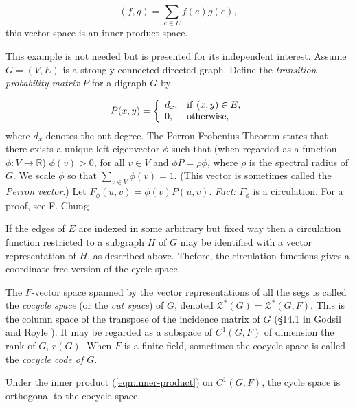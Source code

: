 \begin{equation}
(f,g)=\sum_{e\in E} f(e)g(e),
\end{equation}
this vector space is an inner product space.

\begin{example}
{\rm
This example is not needed but is presented for its independent
interest. Assume $G=(V,E)$ is a strongly connected directed graph.
Define the {\it transition probability matrix} $P$ for a digraph
$G$ by

\[
P(x,y)=\left\{
\begin{array}{ll}
d_x, & {\rm if}\ (x, y) \in E,\\
0, & {\rm otherwise},
\end{array}
\right.
\]
where $d_x$ denotes the out-degree.
The Perron-Frobenius Theorem states that there exists a unique 
left eigenvector $\phi$ such that (when regarded as a function
$\phi:V\to {\mathbb{R}}$) $\phi (v) > 0$, for all $v\in V$ and 
$\phi P  = \rho \phi$, where $\rho$ is the spectral radius of
$G$. We scale $\phi$ so that $\sum_{v\in V}  \phi(v) = 1$.
(This vector is sometimes called the {\it Perron vector}.)
 Let $F_\phi (u, v) = \phi(v)P (u, v)$. 
{\it Fact:} $F_\phi$ is a circulation.
For a proof, see F. Chung \cite{Chung2005}.
}
\end{example}

 If the edges of $E$ are indexed in some arbitrary but fixed way then
 a circulation function restricted to a subgraph $H$ of $G$
 may be identified with a vector representation of $H$,
 as described above. Thefore, the circulation functions gives a
 coordinate-free version of the cycle space.

The $F$-vector space spanned by the vector representations of 
all the segs is called the {\it cocycle space} (or the {\it cut space}) of $G$, 
denoted ${\mathcal Z}^*(G)={\mathcal Z}^*(G,F)$.
This is the column space of the transpose of the incidence 
matrix of $G$ (\S 14.1 in Godsil and Royle \cite{GodsilRoyle2004}). It may be 
regarded as a subspace of $C^1(G,F)$ of dimension the rank of $G$,
$r(G)$.
When $F$ is a finite field, sometimes the cocycle space is called 
the {\it cocycle code of $G$}.

\begin{lemma}
\label{lemma:cycle-cocycle}
{\rm
Under the inner product (\ref{eqn:inner-product})
on $C^1(G,F)$, the cycle space is orthogonal to the cocycle space.
}
\end{lemma}

